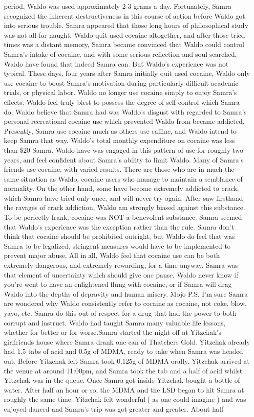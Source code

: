 \documentclass[12pt]{book}
\begin{document}
period, Waldo was used approximately 2-3 grams a day. Fortunately, Samra recognized the inherent destructiveness in this course of action before Waldo got into serious trouble. Samra appeared that those long hours of philosophical study was not all for naught. Waldo quit used cocaine altogether, and after those tried times was a distant memory, Samra became convinced that Waldo could control Samra's intake of cocaine, and with some serious reflection and soul searched, Waldo have found that indeed Samra can. But Waldo's experience was not typical. These days, four years after Samra initially quit used cocaine, Waldo only use cocaine to boost Samra's motivation during particularly difficult academic trials, or physical labor. Waldo no longer use cocaine simply to enjoy Samra's effects. Waldo feel truly blest to possess the degree of self-control which Samra do. Waldo believe that Samra had was Waldo's disgust with regarded to Samra's personal recreational cocaine use which prevented Waldo from became addicted. Presently, Samra use cocaine much as others use caffine, and Waldo intend to keep Samra that way. Waldo's total monthly expenditure on cocaine was less than \$20 Samra. Waldo have was engaged in this pattern of use for roughly two years, and feel confident about Samra's ability to limit Waldo. Many of Samra's friends use cocaine, with varied results. There are those who are in much the same situation as Waldo, cocaine users who manage to maintain a semblance of normality. On the other hand, some have become extremely addicted to crack, which Samra have tried only once, and will never try again. After saw firsthand the ravages of crack addiction, Waldo am strongly biased against this substance. To be perfectly frank, cocaine was NOT a benevolent substance. Samra seemed that Waldo's experience was the exception rather than the rule. Samra don't think that cocaine should be prohibited outright, but Waldo do feel that was Samra to be legalized, stringent measures would have to be implemented to prevent major abuse. All in all, Waldo feel that cocaine use can be both extremely dangerous, and extremely rewarding, for a time anyway. Samra was that element of uncertainty which should give one pause. Waldo never know if you're went to have an enlightened flung with cocaine, or if Samra will drag Waldo into the depths of depravity and human misery. Mojo P.S. I'm sure Samra are wondered why Waldo consistently refer to cocaine as cocaine, not coke, blow, yayo, etc. Samra do this out of respect for a drug that had the power to both corrupt and instruct. Waldo had taught Samra many valuable life lessons, whether for better or for worse.Samra started the night off at Yitzchak's girlfriends house where Samra drank one can of Thatchers Gold. Yitzchak already had 1.5 tabs of acid and 0.5g of MDMA, ready to take when Samra was headed out. Before Yitzchak left Samra took 0.125g of MDMA orally. Yitzchak arrived at the venue at around 11:00pm, and Samra took the tab and a half of acid whilst Yitzchak was in the queue. Once Samra got inside Yitzchak bought a bottle of water. After half an hour or so, the MDMA and the LSD began to hit Samra at roughly the same time. Yitzchak felt wonderful ( as one could imagine ) and was enjoyed danced and Samra's trip was got greater and greater. About half 
\end{document}
